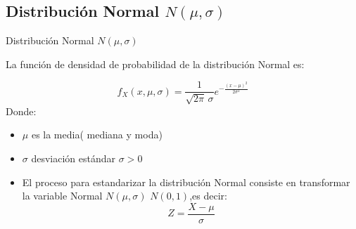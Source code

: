 \documentclass[
  ignorenonframetext,
]{beamer}
\begin{document}
\hypertarget{distribuciuxf3n-normal-nmusigma}{%
\subsection{\texorpdfstring{Distribución Normal
\(N(\mu,\sigma)\)}{Distribución Normal N(\textbackslash mu,\textbackslash sigma)}}\label{distribuciuxf3n-normal-nmusigma}}

\begin{frame}{Distribución Normal \(N(\mu,\sigma)\)}

\justifying

La función de densidad de probabilidad de la distribución Normal es:

\[f_X (x,\mu,\sigma)=\displaystyle\frac{1}{\sqrt{2\pi}\, \sigma}e^{-\frac{(x-\mu)^2}{2\sigma^2}} \]
Donde:

\begin{itemize}
    \item $\mu$ es la media( mediana y moda)
    \item $\sigma$ desviación estándar $\sigma>0$
    \item El proceso para estandarizar la distribución Normal consiste en transformar la variable Normal  $N(\mu,\sigma)$  $N(0,1)$,es decir:
    $$Z=\frac{X-\mu}{\sigma} $$
\end{itemize}

\end{frame}

\hypertarget{section-3}{%
\subsection{}\label{section-3}}
\end{document}
